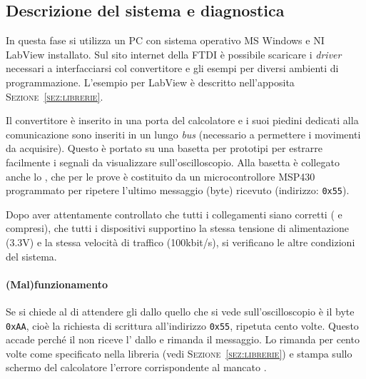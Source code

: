 %   

\subsection{Descrizione del sistema e diagnostica}
In questa fase si utilizza un {PC}
con sistema operativo MS Windows e NI LabView installato.
Sul sito internet della F{TDI} è possibile scaricare
i \textit{driver} necessari a interfacciarsi col convertitore
e gli esempi per diversi ambienti di programmazione.
L'esempio per LabView è descritto nell'apposita \textsc{Sezione~\ref{sez:librerie}}.

Il convertitore è inserito in una porta {\usb} del calcolatore
e i suoi piedini dedicati alla comunicazione {\iic} sono inseriti
in un lungo \textit{bus} (necessario a permettere i movimenti da acquisire).
Questo è portato su una basetta per prototipi
per estrarre facilmente i segnali da visualizzare sull'oscilloscopio.
Alla basetta è collegato anche lo {\slave}, che per le prove
è costituito da un microcontrollore {MSP430}
programmato per ripetere l'ultimo messaggio (byte) ricevuto
(indirizzo: \texttt{0x55}).

Dopo aver attentamente controllato che tutti i collegamenti siano corretti
({\sda} e {\scl} compresi),
che tutti i dispositivi supportino la stessa tensione di alimentazione (3.3V)
e la stessa velocità di traffico (100kbit/s),
si verificano le altre condizioni del sistema.\\

\paragraph{(Mal)funzionamento}
Se si chiede al {\master} di attendere gli {\Ack} dallo {\slave}
quello che si vede sull'oscilloscopio è
il byte \texttt{0xAA}, cioè
la richiesta di scrittura all'indirizzo \texttt{0x55},
ripetuta cento volte. Questo accade perché il {\master}
non riceve l'{\ack} dallo {\slave} e rimanda il messaggio.
Lo rimanda per cento volte come specificato nella libreria
(vedi \textsc{Sezione~\ref{sez:librerie}}) e stampa sullo schermo del calcolatore
l'errore corrispondente al mancato {\Ack}.\\

